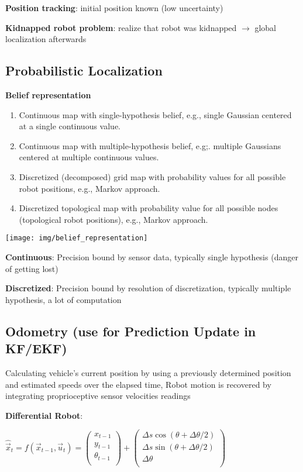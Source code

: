 \documentclass[fontsize=6pt]{scrartcl}
\begin{document}
\begin{multicols*}{4}
\textbf{Position tracking}: initial position known (low uncertainty)

\textbf{Kidnapped robot problem}: realize that robot was kidnapped $\rightarrow$ global localization afterwards

\subsection*{Probabilistic Localization}
\textbf{Belief representation}

\begin{minipage}{0.62\linewidth}
	\begin{enumerate}[label=\alph*)]
		\item Continuous map with single-hypothesis belief, e.g., single Gaussian centered at a single continuous value.
		\item Continuous map with multiple-hypothesis belief, e.g;. multiple Gaussians centered	at multiple continuous values.
		\item Discretized (decomposed) grid map with probability values	for all possible robot positions, e.g., Markov approach.
		\item Discretized topological map with probability value for all possible nodes (topological robot positions), e.g., Markov approach.
	\end{enumerate}
\end{minipage}
\begin{minipage}{0.38\linewidth}
	\texttt{[image: img/belief\_representation]}
\end{minipage}

\textbf{Continuous}: Precision bound by sensor data, typically single hypothesis (danger of getting lost)

\textbf{Discretized}: Precision bound by resolution of discretization, typically multiple hypothesis, a lot of computation

\subsection*{Odometry (use for Prediction Update in KF/EKF)}
Calculating vehicle's current position by using a previously determined position and estimated speeds over the elapsed time, Robot motion is recovered by integrating proprioceptive sensor velocities readings

\textbf{Differential Robot}:

{\centering 
$\hat{\vec x}_t = f(\vec x_{t-1}, \vec u_t) =
\begin{pmatrix}
x_{t-1}\\
y_{t-1}\\
\theta_{t-1}\\
\end{pmatrix}
+ 
\begin{pmatrix}
\Delta s \cos(\theta + \Delta\theta/2)\\
\Delta s \sin(\theta + \Delta\theta/2)\\
\Delta \theta\\
\end{pmatrix}
$

}
\end{multicols*}
\end{document}
